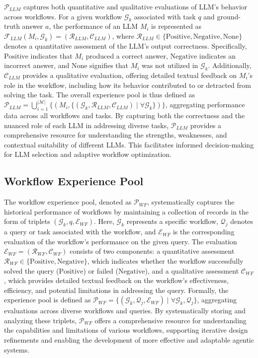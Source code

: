 \documentclass{article}
\theoremstyle{plain}
\theoremstyle{definition}
\theoremstyle{remark}
\begin{document}
\(\mathcal{P}_{LLM}\) captures both quantitative and qualitative evaluations of LLM's behavior across workflows. For a given workflow \(\mathcal{G}_k\) associated with task \(q\) and ground-truth answer \(a\), the performance of an LLM \(M_i\) is represented as \(\mathcal{F}_{LLM}(M_i, \mathcal{G}_k) = (\mathcal{R}_{LLM}, \mathcal{C}_{LLM})\), where \(\mathcal{R}_{LLM} \in \{\text{Positive}, \text{Negative}, \text{None}\}\) denotes a quantitative assessment of the LLM's output correctness. Specifically, \(\text{Positive}\) indicates that \(M_i\) produced a correct answer, \(\text{Negative}\) indicates an incorrect answer, and \(\text{None}\) signifies that \(M_i\) was not utilized in \(\mathcal{G}_k\). Additionally, \(\mathcal{C}_{LLM}\) provides a qualitative evaluation, offering detailed textual feedback on \(M_i\)'s role in the workflow, including how its behavior contributed to or detracted from solving the task. The overall experience pool is thus defined as \(\mathcal{P}_{LLM} = \bigcup_{i=1}^{|\mathcal{M}|} \{(M_i, \{(\mathcal{G}_k, \mathcal{R}_{LLM}, \mathcal{C}_{LLM}) \mid \forall \mathcal{G}_k \})\}\), aggregating performance data across all workflows and tasks. By capturing both the correctness and the nuanced role of each LLM in addressing diverse tasks, \(\mathcal{P}_{LLM}\) provides a comprehensive resource for understanding the strengths, weaknesses, and contextual suitability of different LLMs. This facilitates informed decision-making for LLM selection and adaptive workflow optimization.  


\subsection{Workflow Experience Pool}\label{app:workflow_pool}
  
The workflow experience pool, denoted as \(\mathcal{P}_{WF}\), systematically captures the historical performance of workflows by maintaining a collection of records in the form of triplets \((\mathcal{G}_k, q, \mathcal{E}_{WF})\). Here, \(\mathcal{G}_k\) represents a specific workflow, \(\mathcal{Q}_j\) denotes a query or task associated with the workflow, and \(\mathcal{E}_{WF}\) is the corresponding evaluation of the workflow's performance on the given query. The evaluation \(\mathcal{E}_{WF} = (\mathcal{R}_{WF}, \mathcal{C}_{WF})\) consists of two components: a quantitative assessment \(\mathcal{R}_{WF} \in \{\text{Positive}, \text{Negative}\}\), which indicates whether the workflow successfully solved the query (\(\text{Positive}\)) or failed (\(\text{Negative}\)), and a qualitative assessment \(\mathcal{C}_{WF}\), which provides detailed textual feedback on the workflow's effectiveness, efficiency, and potential limitations in addressing the query. Formally, the experience pool is defined as \(\mathcal{P}_{WF} = \{(\mathcal{G}_k, \mathcal{Q}_j, \mathcal{E}_{WF}) \mid \forall \mathcal{G}_k, \mathcal{Q}_j\}\), aggregating evaluations across diverse workflows and queries. By systematically storing and analyzing these triplets, \(\mathcal{P}_{WF}\) offers a comprehensive resource for understanding the capabilities and limitations of various workflows, supporting iterative design refinements and enabling the development of more effective and adaptable agentic systems.
\end{document}
